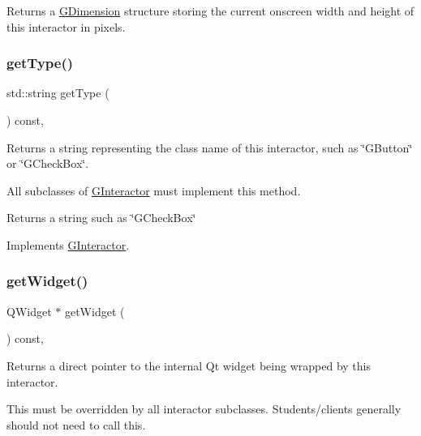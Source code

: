 Returns a \mbox{\hyperlink{structGDimension}{G\+Dimension}} structure storing the current onscreen width and height of this interactor in pixels. 

\mbox{\label{classGTable_a9b72ede4ee8520f987a0c01e30654814}} 
\subsubsection{\texorpdfstring{get\+Type()}{getType()}}
{\footnotesize\ttfamily std\+::string get\+Type (\begin{DoxyParamCaption}{ }\end{DoxyParamCaption}) const\hspace{0.3cm}{\ttfamily [override]}, {\ttfamily [virtual]}}



Returns a string representing the class name of this interactor, such as \char`\"{}\+G\+Button\char`\"{} or \char`\"{}\+G\+Check\+Box\char`\"{}. 

All subclasses of \mbox{\hyperlink{classGInteractor}{G\+Interactor}} must implement this method. \begin{DoxyReturn}{Returns}
a string such as \char`\"{}\+G\+Check\+Box\char`\"{} 
\end{DoxyReturn}


Implements \mbox{\hyperlink{classGInteractor_a44c407a54a20dd0f2fff30338289299d}{G\+Interactor}}.

\mbox{\label{classGTable_a3b33a602b31a6b809d020535a59db3b4}} 
\subsubsection{\texorpdfstring{get\+Widget()}{getWidget()}}
{\footnotesize\ttfamily Q\+Widget $\ast$ get\+Widget (\begin{DoxyParamCaption}{ }\end{DoxyParamCaption}) const\hspace{0.3cm}{\ttfamily [override]}, {\ttfamily [virtual]}}



Returns a direct pointer to the internal Qt widget being wrapped by this interactor. 

This must be overridden by all interactor subclasses. Students/clients generally should not need to call this. 

